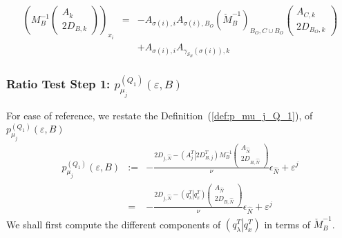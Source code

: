 \documentclass[a4paper]{article}
\newcommand{\pmu}[2]{\ensuremath{p_{\mu_{j}}^{(#1)}(\varepsilon, #2)}}
\begin{document}
\begin{enumerate}
\begin{eqnarray}
\label{eq:r1_i_B_S_k_N_O}
\left(M_{B}^{-1}
           \left(\begin{array}{c}
                   A_{k} \\
	           \hline
	           2D_{B, k}
	         \end{array}
           \right)
\right)_{x_{i}}
&=&
-A_{\sigma(i),i}A_{\sigma(i), B_{O}}\left(\check{M}_{B}^{-1}\right)_{B_{O},
  C \cup B_{O}}
\left(\begin{array}{c}
        A_{C,k} \\
	\hline
	2D_{B_{O},k}
       \end{array}
\right)
\nonumber \\
&&
+A_{\sigma(i), i}A_{\gamma_{S_{B}}(\sigma(i)), k}
\end{eqnarray}
\end{enumerate}

\subsubsection{Ratio Test Step 1:
\pmu{Q_{1}}{B}}
For ease of reference, we restate the Definition~(\ref{def:p_mu_j_Q_1}),
of \pmu{Q_{1}}{B}
\begin{eqnarray*}
\pmu{Q_{1}}{B} &:=& 
  -\frac{2D_{j, \hat{N}} -
    \left(A_{j}^{T} \left| \right. 2D_{B, j}^{T} \right)
    M_{B}^{-1}
    \left(\begin{array}{c}
            A_{\hat{N}} \\
	    \hline
	    2D_{B,\hat{N}}
	  \end{array}
    \right)}{\nu}
  \epsilon_{\hat{N}}
  +\varepsilon^{j}
\\
&=&
  -\frac{2D_{j, \hat{N}} -
    \left(q_{\lambda}^{T} \left| \right. q_{x}^{T} \right)
    \left(\begin{array}{c}
            A_{\hat{N}} \\
	    \hline
	    2D_{B,\hat{N}}
	  \end{array}
    \right)}{\nu}
  \epsilon_{\hat{N}}
  +\varepsilon^{j}
\end{eqnarray*}
We shall first compute the different components of
$\left(q_{\lambda}^{T} \left|\right. q_{x}^{T}\right)$ in terms of
$\check{M}_{B}^{-1}$.
\end{document}
